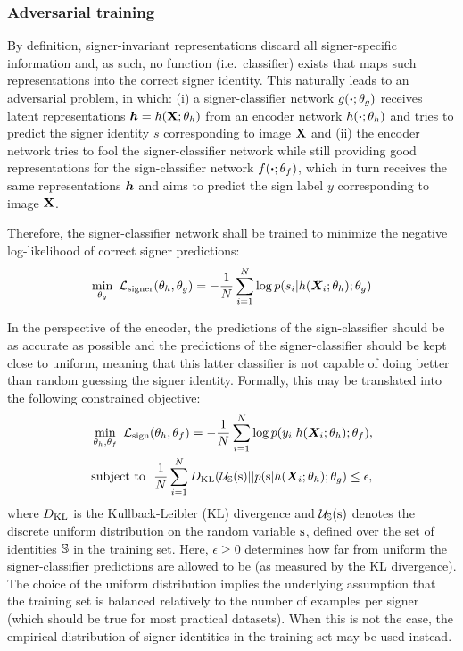 

\subsubsection{Adversarial training}
\hspace{\parindent}By definition, signer-invariant representations discard all signer-specific information and, as such, no function (i.e.\ classifier) exists that maps such representations into the correct signer identity. This naturally leads to an adversarial problem, in which: (i) a signer-classifier network $g(\boldsymbol{\cdot}; \theta_g)$ receives latent representations ${\bm{h}}=h({\mathbf{X}};\theta_h)$ from an encoder network $h(\boldsymbol{\cdot};\theta_h)$ and tries to predict the signer identity $s$ corresponding to image ${\mathbf{X}}$ and (ii) the encoder network tries to fool the signer-classifier network while still providing good representations for the sign-classifier network $f(\boldsymbol{\cdot}; \theta_f)$, which in turn receives the same representations ${\bm{h}}$ and aims to predict the sign label $y$ corresponding to image ${\mathbf{X}}$.

Therefore, the signer-classifier network shall be trained to minimize the negative log-likelihood of correct signer predictions:
\begin{equation}
\label{eq:signer_loss}
\min_{\theta_g}~{\mathcal{L}}_{\text{signer}}(\theta_h, \theta_g) = -\frac{1}{N}\sum_{i=1}^N \log p(s_i | h({\bm{X}}_{i}; \theta_h); \theta_g)
\end{equation}

In the perspective of the encoder, the predictions of the sign-classifier should be as accurate as possible and the predictions of the signer-classifier should be kept close to uniform, meaning that this latter classifier is not capable of doing better than random guessing the signer identity. Formally, this may be translated into the following constrained objective:
\begin{align}
\label{eq:sign_loss}
&\min_{\theta_h, \theta_f}~{\mathcal{L}}_{\text{sign}}(\theta_h, \theta_f)=-\frac{1}{N}\sum_{i=1}^N \log p(y_i | h({\bm{X}}_{i}; \theta_h); \theta_f),\\
\label{eq:kl_obj}
&\text{subject to }~\frac{1}{N}\sum_{i=1}^N D_{\mathrm{KL}}({\mathcal{U}}_{{\mathbb{S}}}({\textnormal{s}}) || p({\textnormal{s}} | h({\bm{X}}_{i}; \theta_h); \theta_g) \leq \epsilon,
\end{align}
where $D_{\mathrm{KL}}$ is the Kullback-Leibler (KL) divergence and ${\mathcal{U}}_{{\mathbb{S}}}({\textnormal{s}})$ denotes the discrete uniform distribution on the random variable ${\textnormal{s}}$, defined over the set of identities ${\mathbb{S}}$ in the training set. Here, $\epsilon \geq 0$ determines how far from uniform the signer-classifier predictions are allowed to be (as measured by the KL divergence). The choice of the uniform distribution implies the underlying assumption that the training set is balanced relatively to the number of examples per signer (which should be true for most practical datasets). When this is not the case, the empirical distribution of signer identities in the training set may be used instead.

